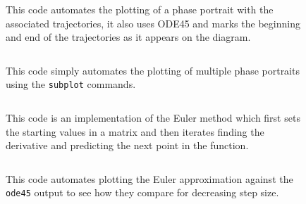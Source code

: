 \documentclass[11pt]{report}
\begin{document}
\begin{appendices}
		\begin{figure}[h]
			\begin{framed}
				\begin{center}
					\inputminted[]{matlab}{../phase_portrait_trajectories.m}
				\end{center}
			\end{framed}
			\caption{This code automates the plotting of a phase portrait with the associated trajectories, it also uses ODE45 and marks the beginning and end of the trajectories as it appears on the diagram.}
			\label{fig:phase_portrait_trajectories_code}
		\end{figure}
		
		\begin{figure}[h]
			\begin{framed}
				\begin{center}
					\inputminted[]{matlab}{../generate_phase_plots.m}
				\end{center}
			\end{framed}
			\caption{This code simply automates the plotting of multiple phase portraits using the \texttt{subplot} commands.}
			\label{fig:multi_phase_portrait_plotting_code}
		\end{figure}
		
		\begin{figure}[h]
			\begin{framed}
				\begin{center}
					\inputminted[]{matlab}{../euler_method.m}
				\end{center}
			\end{framed}
			\caption{This code is an implementation of the Euler method which first sets the starting values in a matrix and then iterates finding the derivative and predicting the next point in the function.}
			\label{fig:euler_method_code}
		\end{figure}
		
		\begin{figure}[h]
			\begin{framed}
				\begin{center}
					\inputminted[]{matlab}{../compare_euler_ode45.m}
				\end{center}
			\end{framed}
			\caption{This code automates plotting the Euler approximation against the \texttt{ode45} output to see how they compare for decreasing step size.}
			\label{fig:euler_ode45_compare_code}
		\end{figure}
		
		
	\end{appendices}
\end{document}
